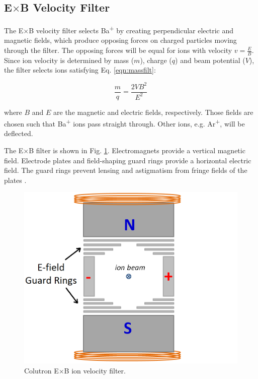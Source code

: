 \subsection{E$\times$B Velocity Filter}

The E$\times$B velocity filter selects Ba\textsuperscript{+} by creating perpendicular electric and magnetic fields, which produce opposing forces on charged particles moving through the filter.  The opposing forces will be equal for ions with velocity $v = \frac{E}{B}$.  Since ion velocity is determined by mass ($m$), charge ($q$) and beam potential ($V$), the filter selects ions satisfying Eq. \ref{eqn:massfilt}:

\begin{equation}
\frac{m}{q} = \frac{2 V B^{2}}{E^{2}}
\label{eqn:massfilt}
\end{equation}

\noindent
where $B$ and $E$ are the magnetic and electric fields, respectively.  Those fields are chosen such that Ba\textsuperscript{+} ions pass straight through.  Other ions, e.g. Ar\textsuperscript{+}, will be deflected.  

The E$\times$B filter is shown in Fig. \ref{fig:exb}.  Electromagnets provide a vertical magnetic field.  Electrode plates and field-shaping guard rings provide a horizontal electric field.  The guard rings prevent lensing and astigmatism from fringe fields of the plates \cite{Colutron}.

\begin{figure}[h]
        \centering
                \includegraphics[width=.7\textwidth]{figures/ExB.png}
                \caption{Colutron E$\times$B ion velocity filter.}
\label{fig:exb}
\end{figure}



